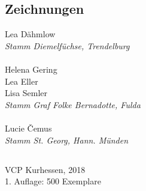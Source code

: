 \begin{centering}
\begin{multicols}{2}
\subsection*{Zeichnungen}
Lea Dähmlow \\ \textit{Stamm Diemelfüchse, Trendelburg} \\ ~\\
Helena Gering \\ Lea Eller \\ Lisa Semler \\ \textit{Stamm Graf Folke Bernadotte, Fulda} \\ ~\\
Lucie \v{C}emus \\ \textit{Stamm St. Georg, Hann. Münden} \\

\end{multicols}

\vfill

\subsection*{}
VCP Kurhessen, 2018 \\
1. Auflage: 500 Exemplare

\end{centering}

